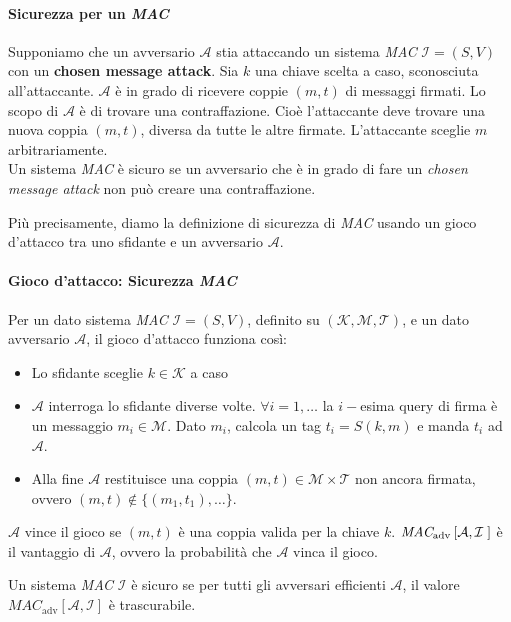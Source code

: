 \paragraph{Sicurezza per un \emph{MAC}} Supponiamo che un avversario $\mathcal{A}$ stia attaccando un sistema \emph{MAC} $\mathcal{I}=(S,V)$ con un \textbf{chosen message attack}. Sia $k$ una chiave scelta a caso, sconosciuta all'attaccante. $\mathcal{A}$ è in grado di ricevere coppie $(m,t)$ di messaggi firmati. Lo scopo di $\mathcal{A}$ è di trovare una contraffazione. Cioè l'attaccante deve trovare una nuova coppia $(m,t)$, diversa da tutte le altre firmate. L'attaccante sceglie $m$ arbitrariamente. \\ Un sistema \emph{MAC} è sicuro se un avversario che è in grado di fare un \textit{chosen message attack} non può creare una contraffazione.  

\vspace{0.2cm} \noindent Più precisamente, diamo la definizione di sicurezza di \emph{MAC} usando un gioco d'attacco tra uno sfidante e un avversario $\mathcal{A}$. 

\paragraph{Gioco d'attacco: Sicurezza \emph{MAC}} Per un dato sistema \emph{MAC} $\mathcal{I}=(S,V)$, definito su $(\mathcal{K},\mathcal{M},\mathcal{T})$, e un dato avversario $\mathcal{A}$, il gioco d'attacco funziona così:
\begin{itemize}
    \item Lo sfidante sceglie $k \in \mathcal{K}$ a caso
    \item $\mathcal{A}$ interroga lo sfidante diverse volte. $\forall i=1, \dots$ la $i-$esima query di firma è un messaggio $m_i \in \mathcal{M}$. Dato $m_i$, calcola un tag $t_i = S(k,m)$ e manda $t_i$ ad $\mathcal{A}$.
    \item  Alla fine $\mathcal{A}$ restituisce una coppia $(m,t) \in \mathcal{M} \times \mathcal{T}$ non ancora firmata, ovvero $(m,t) \not\in \{(m_1,t_1),\dots\}$. 
\end{itemize}
\noindent $\mathcal{A}$ vince il gioco se $(m,t)$ è una coppia valida per la chiave $k$. $\emph{MAC}_{\text{adv}}\left[\mathcal{A},\mathcal{I}\;\right]$ è il vantaggio di $\mathcal{A}$, ovvero la probabilità che $\mathcal{A}$ vinca il gioco. 

\vspace{0.2cm} \noindent Un sistema \textit{MAC} $\mathcal{I}$ è sicuro se per tutti gli avversari efficienti $\mathcal{A}$, il valore $MAC_{\text{adv}}[\mathcal{A},\mathcal{I}]$ è trascurabile. 

